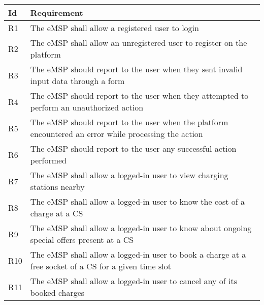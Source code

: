 \documentclass[11pt]{article}
\begin{document}
\begin{table}[H]
    \centering
    \setlength{\tabcolsep}{18pt}
    \renewcommand{\arraystretch}{1.2}
    \begin{tabularx}{\textwidth}{|>{\centering\hsize=0.1\hsize}X|>{\hsize=1.9\hsize}X|}
        \hline
        \textbf{Id} & \textbf{Requirement} \\
        \hline
        R1 & The eMSP shall allow a registered user to login \\
        \hline
        R2 & The eMSP shall allow an unregistered user to register on the platform \\
        \hline
        R3 & The eMSP should report to the user when they sent invalid input data through a form \\
        \hline
        R4 & The eMSP should report to the user when they attempted to perform an unauthorized action \\
        \hline
        R5 & The eMSP should report to the user when the platform encountered an error while processing the action \\
        \hline
        R6 & The eMSP should report to the user any successful action performed \\
        \hline
        R7 & The eMSP shall allow a logged-in user to view charging stations nearby \\
        \hline
        R8 & The eMSP shall allow a logged-in user to know the cost of a charge at a CS \\
        \hline
        R9 & The eMSP shall allow a logged-in user to know about ongoing special offers present at a CS \\
        \hline
        R10 & The eMSP shall allow a logged-in user to book a charge at a free socket of a CS for a given time slot \\
        \hline
        R11 & The eMSP shall allow a logged-in user to cancel any of its booked charges \\
        \hline 
    \end{tabularx}
    \label{tab:requirements}
\end{table}
\end{document}
